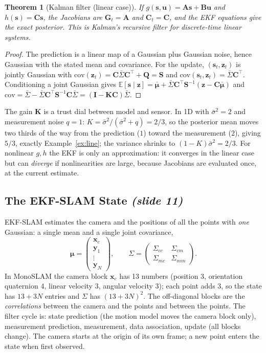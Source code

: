 \documentclass[11pt,a4paper]{article}
\newcommand{\slrs}[1]{\texorpdfstring{\emph{(slide #1)}}{(slide #1)}}
\newcommand{\bx}{\bm{x}}
\newcommand{\by}{\mathbf{y}}
\newcommand{\bz}{\bm{z}}
\newcommand{\bu}{\mathbf{u}}
\newcommand{\bs}{\mathbf{s}}
\newcommand{\bK}{\mathbf{K}}
\newcommand{\bS}{\mathbf{S}}
\newcommand{\bG}{\mathbf{G}}
\newcommand{\bC}{\mathbf{C}}
\newcommand{\bI}{\mathbf{I}}
\theoremstyle{definition}
\theoremstyle{plain}
\newtheorem{theorem}[definition]{Theorem}
\theoremstyle{remark}
\begin{document}
\begin{theorem}[Kalman filter (linear case)]\label{thm:kf}
If $g(\bs,\bu)=\mathbf A\bs+\mathbf B\bu$ and $h(\bs)=\mathbf C\bs$, the Jacobians are $\bG_t=\mathbf A$ and $\bC_t=\mathbf C$, and the EKF equations give the \emph{exact} posterior. This is Kalman's recursive filter for discrete-time linear systems.
\end{theorem}
\begin{proof}
The prediction is a linear map of a Gaussian plus Gaussian noise, hence Gaussian with the stated mean and covariance. For the update, $(\bs_t,\bz_t)$ is jointly Gaussian with $\mathrm{cov}(\bz_t)=\mathbf C\bar\Sigma\mathbf C^\top+\mathbf Q=\bS$ and $\mathrm{cov}(\bs_t,\bz_t)=\bar\Sigma\mathbf C^\top$. Conditioning a joint Gaussian gives $\mathbb E[\bs\mid\bz]=\bar{\boldsymbol\mu}+\bar\Sigma\mathbf C^\top\bS^{-1}(\bz-\mathbf C\bar{\boldsymbol\mu})$ and $\mathrm{cov}=\bar\Sigma-\bar\Sigma\mathbf C^\top\bS^{-1}\mathbf C\bar\Sigma=(\bI-\bK\mathbf C)\bar\Sigma$. \qedhere
\end{proof}
\begin{intuition}
The gain $\bK$ is a trust dial between model and sensor. In 1D with $\bar\sigma^2=2$ and measurement noise $q=1$: $K=\bar\sigma^2/(\bar\sigma^2+q)=2/3$, so the posterior mean moves two thirds of the way from the prediction ($1$) toward the measurement ($2$), giving $5/3$, exactly Example~\ref{ex:line}; the variance shrinks to $(1-K)\bar\sigma^2=2/3$. For nonlinear $g,h$ the EKF is only an approximation: it converges in the linear case but can \emph{diverge} if nonlinearities are large, because Jacobians are evaluated once, at the current estimate.
\end{intuition}

\subsection{The EKF-SLAM State \slrs{11}}
EKF-SLAM estimates the camera and the positions of all the points with \emph{one} Gaussian: a single mean and a single joint covariance,
\[
\boldsymbol\mu=\begin{pmatrix}\bx_c\\\by_1\\\vdots\\\by_N\end{pmatrix},\qquad
\Sigma=\begin{pmatrix}\Sigma_{cc}&\Sigma_{cm}\\\Sigma_{mc}&\Sigma_{mm}\end{pmatrix}.
\]
In MonoSLAM the camera block $\bx_c$ has 13 numbers (position 3, orientation quaternion 4, linear velocity 3, angular velocity 3); each point adds 3, so the state has $13+3N$ entries and $\Sigma$ has $(13+3N)^2$. The off-diagonal blocks are the \emph{correlations} between the camera and the points and between the points. The filter cycle is: state prediction (the motion model moves the camera block only), measurement prediction, measurement, data association, update (all blocks change). The camera starts at the origin of its own frame; a new point enters the state when first observed.
\end{document}
